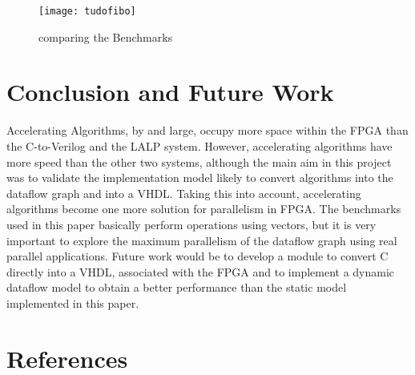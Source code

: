 \documentclass[preprint,12pt]{elsarticle}
\begin{document}
\begin{figure}[h]
\begin{center}
   \texttt{[image: tudofibo]}
   \caption{comparing the Benchmarks} \label{f8}
\end{center}
\end{figure}



\section{Conclusion and Future Work}\label{l5}


Accelerating Algorithms, by and large, occupy more space within the FPGA than the C-to-Verilog and the LALP system.  However, accelerating algorithms have more speed than the other two systems, although the main aim in this project was to validate the implementation model likely to convert algorithms into the dataflow graph and into a VHDL. Taking this into account, accelerating algorithms become one more solution for parallelism in FPGA. The benchmarks used in this paper basically perform operations using vectors, but it is very important to explore the maximum parallelism of the dataflow graph using real parallel applications. Future work would be to develop a module to convert C directly into a VHDL, associated with the FPGA and  to implement a dynamic dataflow model to obtain a better performance than the static model implemented in this paper.

\section*{References}








\end{document}
